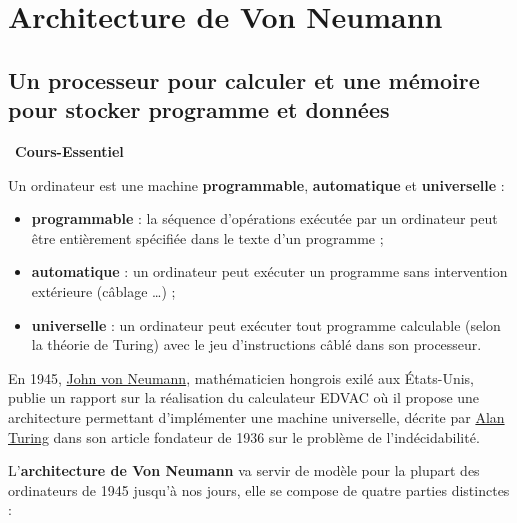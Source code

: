 \documentclass[a4paper, french, 11pt]{article}  %
\newcounter{prop}
\newcounter{cours}
\newenvironment{cours}[1]
{\par \medskip   \addtocounter{cours}{1} \noindent  
\begin{bclogo}[arrondi =0.1,  ombre = true, barre=none, logo=\bcbook, marge=4]{~\textbf{Cours-Essentiel} \textbf{\thecours} {\itshape #1} }  \par}
{
\end{bclogo}
 \par \bigskip }
\newcounter{prog}
\begin{document}
\section{Architecture de Von Neumann}

\subsection{Un processeur pour calculer et une mémoire pour stocker programme et données}


\begin{cours}{}

Un ordinateur est une machine \textbf{programmable}, \textbf{automatique} et \textbf{universelle} :

\begin{itemize}
	
	\item \textbf{programmable} : la séquence d'opérations exécutée par un ordinateur peut être entièrement spécifiée dans le texte d'un programme ;
	\item \textbf{automatique} : un ordinateur peut exécuter un programme sans intervention extérieure (câblage \ldots) ;
	\item \textbf{universelle} : un ordinateur peut exécuter tout programme calculable (selon la théorie de Turing) avec le jeu d'instructions câblé dans son processeur.	

\end{itemize}

En 1945,  \href{https://fr.wikipedia.org/wiki/John_von_Neumann}{John von Neumann}, mathématicien hongrois exilé aux États-Unis, publie un rapport sur la réalisation du calculateur EDVAC où il propose une architecture permettant d'implémenter une machine universelle, décrite par \href{https://interstices.info/alan-turing-itineraire-dun-precurseur/}{Alan Turing} dans son article fondateur de 1936 sur le problème de l'indécidabilité. 

L'\textbf{architecture de Von Neumann }va servir de modèle pour la plupart des ordinateurs de 1945 jusqu'à nos jours, elle se compose de quatre parties distinctes :

\begin{itemize}[label=]


\end{itemize}
\end{cours}
\end{document}
